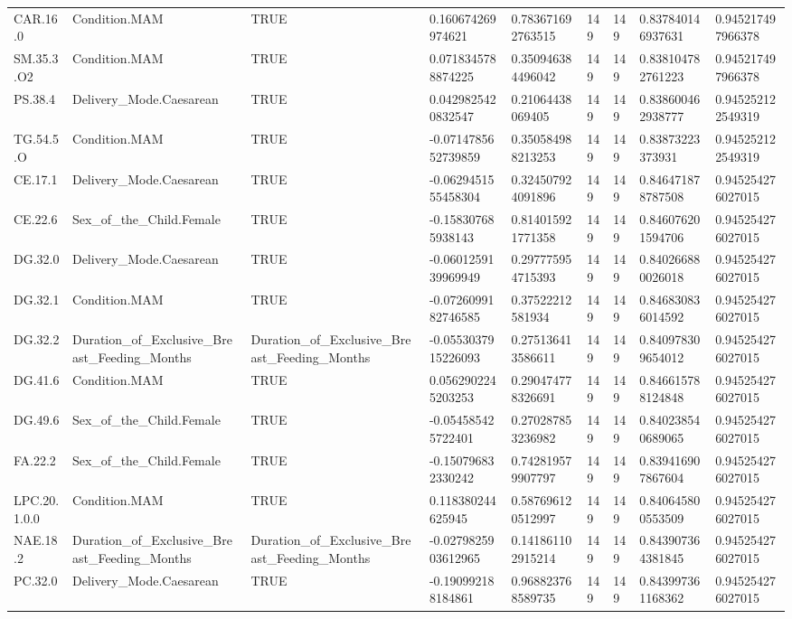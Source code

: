 \begin{longtable}{lllllllll}
CAR.16.0 & Condition.MAM & TRUE & 0.160674269974621 & 0.783671692763515 & 149 & 149 & 0.837840146937631 & 0.945217497966378 \\
SM.35.3.O2 & Condition.MAM & TRUE & 0.0718345788874225 & 0.350946384496042 & 149 & 149 & 0.838104782761223 & 0.945217497966378 \\
PS.38.4 & Delivery\_Mode.Caesarean & TRUE & 0.0429825420832547 & 0.21064438069405 & 149 & 149 & 0.838600462938777 & 0.945252122549319 \\
TG.54.5.O & Condition.MAM & TRUE & -0.0714785652739859 & 0.350584988213253 & 149 & 149 & 0.83873223373931 & 0.945252122549319 \\
CE.17.1 & Delivery\_Mode.Caesarean & TRUE & -0.0629451555458304 & 0.324507924091896 & 149 & 149 & 0.846471878787508 & 0.945254276027015 \\
CE.22.6 & Sex\_of\_the\_Child.Female & TRUE & -0.158307685938143 & 0.814015921771358 & 149 & 149 & 0.846076201594706 & 0.945254276027015 \\
DG.32.0 & Delivery\_Mode.Caesarean & TRUE & -0.0601259139969949 & 0.297775954715393 & 149 & 149 & 0.840266880026018 & 0.945254276027015 \\
DG.32.1 & Condition.MAM & TRUE & -0.0726099182746585 & 0.37522212581934 & 149 & 149 & 0.846830836014592 & 0.945254276027015 \\
DG.32.2 & Duration\_of\_Exclusive\_Breast\_Feeding\_Months & Duration\_of\_Exclusive\_Breast\_Feeding\_Months & -0.0553037915226093 & 0.275136413586611 & 149 & 149 & 0.840978309654012 & 0.945254276027015 \\
DG.41.6 & Condition.MAM & TRUE & 0.0562902245203253 & 0.290474778326691 & 149 & 149 & 0.846615788124848 & 0.945254276027015 \\
DG.49.6 & Sex\_of\_the\_Child.Female & TRUE & -0.054585425722401 & 0.270287853236982 & 149 & 149 & 0.840238540689065 & 0.945254276027015 \\
FA.22.2 & Sex\_of\_the\_Child.Female & TRUE & -0.150796832330242 & 0.742819579907797 & 149 & 149 & 0.839416907867604 & 0.945254276027015 \\
LPC.20.1.0.0 & Condition.MAM & TRUE & 0.118380244625945 & 0.587696120512997 & 149 & 149 & 0.840645800553509 & 0.945254276027015 \\
NAE.18.2 & Duration\_of\_Exclusive\_Breast\_Feeding\_Months & Duration\_of\_Exclusive\_Breast\_Feeding\_Months & -0.0279825903612965 & 0.141861102915214 & 149 & 149 & 0.843907364381845 & 0.945254276027015 \\
PC.32.0 & Delivery\_Mode.Caesarean & TRUE & -0.190992188184861 & 0.968823768589735 & 149 & 149 & 0.843997361168362 & 0.945254276027015 \\

\end{longtable}
